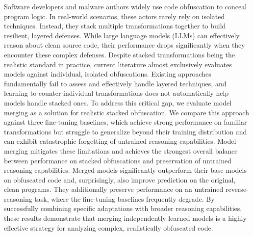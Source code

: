 Software developers and malware authors widely use code obfuscation to conceal program logic.
In real-world scenarios, these actors rarely rely on isolated techniques. Instead, they stack multiple
transformations together to build resilient, layered defenses. While large language models (LLMs)
can effectively reason about clean source code, their performance drops significantly when they
encounter these complex defenses. Despite stacked transformations being the realistic standard
in practice, current literature almost exclusively evaluates models against individual, isolated
obfuscations. Existing approaches fundamentally fail to assess and effectively handle layered
techniques, and learning to counter individual transformations does not automatically help models
handle stacked ones. To address this critical gap, we evaluate model merging as a solution for realistic stacked
obfuscation. We compare this approach against three fine-tuning baselines, which achieve strong
performance on familiar transformations but struggle to generalize beyond their training distribution
and can exhibit catastrophic forgetting of untrained reasoning capabilities. Model merging mitigates
these limitations and achieves the strongest overall balance between performance on stacked
obfuscations and preservation of untrained reasoning capabilities. Merged models significantly outperform their base models on obfuscated code and, surprisingly,
also improve prediction on the original, clean programs. They additionally preserve performance on
an untrained reverse-reasoning task, where the fine-tuning baselines frequently degrade. By
successfully combining specific adaptations with broader reasoning capabilities, these results
demonstrate that merging independently learned models is a highly effective strategy for analyzing
complex, realistically obfuscated code.
